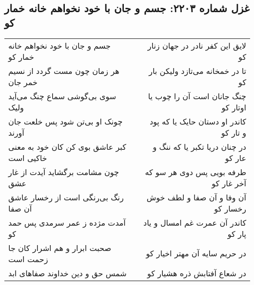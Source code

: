 \begin{center}
\section*{غزل شماره ۲۲۰۳: جسم و جان با خود نخواهم خانه خمار کو}
\label{sec:2203}
\begin{longtable}{l p{0.5cm} r}
جسم و جان با خود نخواهم خانه خمار کو
&&
لایق این کفر نادر در جهان زنار کو
\\
هر زمان چون مست گردد از نسیم خمر جان
&&
تا در خمخانه می‌تازد ولیکن بار کو
\\
سوی بی‌گوشی سماع چنگ می‌آید ولیک
&&
چنگ جانان است آن را چوب یا اوتار کو
\\
چونک او بی‌تن شود پس خلعت جان آورند
&&
کاندر او دستان حایک یا که پود و تار کو
\\
کبر عاشق بوی کن کان خود به معنی خاکیی است
&&
در چنان دریا تکبر یا که ننگ و عار کو
\\
چون مشامت برگشاید آیدت از غار عشق
&&
طرفه بویی پس دوی هر سو که آخر غار کو
\\
رنگ بی‌رنگی است از رخسار عاشق آن صفا
&&
آن وفا و آن صفا و لطف خوش رخسار کو
\\
آمدت مژده ز عمر سرمدی پس حمد کو
&&
کاندر آن عمرت غم امسال و یاد پار کو
\\
صحبت ابرار و هم اشرار کان جا زحمت است
&&
در حریم سایه آن مهتر اخیار کو
\\
شمس حق و دین خداوند صفاهای ابد
&&
در شعاع آفتابش ذره هشیار کو
\\
\end{longtable}
\end{center}
